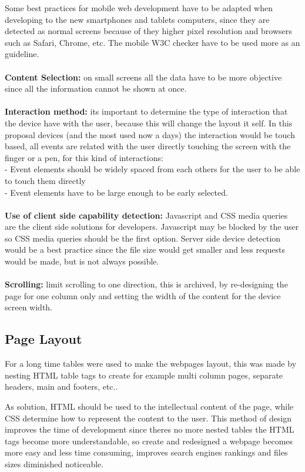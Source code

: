 Some best practices for mobile web development have to be adapted when developing to the new smartphones and tablets computers, since they are detected as normal screens because of they higher pixel resolution and browsers such as Safari, Chrome, etc. The mobile W3C checker have to be used more as an guideline. 
\\
\\ \textbf{Content Selection:} on small screens all the data have to be more objective since all the information cannot be shown at once.\\
\\ \textbf{Interaction method:} its important to determine the type of interaction that the device have with the user, because this will change the layout it self. In this proposal devices (and the most used now a days) the interaction would be touch based, all events are related with the user directly touching the screen with the finger or a pen, for this kind of interactions:\\
- Event elements should be widely spaced from each others for the user to be able to touch them directly\\
- Event elements have to be large enough to be early selected.\\
\\\textbf{Use of client side capability detection:} Javascript and CSS media queries are the client side solutions for developers. Javascript may be blocked by the user so CSS media queries should be the first option. Server side device detection would be a best practice since the file size would get smaller and less requests would be made, but is not always possible.\\
\\\textbf{Scrolling:} limit scrolling to one direction, this is archived, by re-designing the page for one column only and setting the width of the content for the device screen width.\\


\newpage

\subsection{Page Layout}

For a long time tables were used to make the webpages layout, this was made by nesting HTML table tags to create for example multi column pages, separate headers, main and footers, etc..

As solution, HTML should be used to the intellectual content of the page, while CSS determine how to represent the content to the user. This method of design improves the time of development since theres no more nested tables the HTML tags become more understandable, so create and redesigned a webpage becomes more easy and less time consuming, improves search engines rankings and files sizes diminished noticeable.

